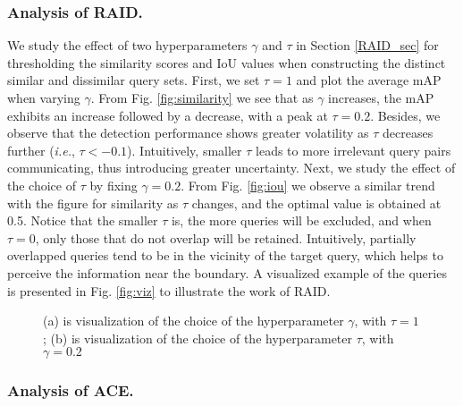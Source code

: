\documentclass[runningheads]{llncs}
\def\ie{{\em i.e.}}
\newcommand{\figref}[1]{Fig. \ref{#1}}
\newcommand{\secref}[1]{Section \ref{#1}}
\begin{document}
\subsubsection{Analysis of RAID.} We study the effect of two hyperparameters $\gamma$ and $\tau$ in \secref{RAID_sec} for thresholding the similarity scores and IoU values when constructing the distinct similar and dissimilar query sets. First, we set $\tau = 1$ and plot the average mAP when varying $\gamma$. From \figref{fig:similarity} we see that as $\gamma$ increases, the mAP exhibits an increase followed by a decrease, with a peak at $\tau=0.2$. Besides, we observe that the detection performance shows greater volatility as $\tau$ decreases further (\ie, $\tau<-0.1$). Intuitively, smaller $\tau$ leads to more irrelevant query pairs communicating, thus introducing greater uncertainty. Next, we study the effect of the choice of $\tau$ by fixing $\gamma = 0.2$. From \figref{fig:iou} we observe a similar trend with the figure for similarity as $\tau$ changes, and the optimal value is obtained at 0.5. Notice that the smaller $\tau$ is, the more queries will be excluded, and when $\tau=0$, only those that do not overlap will be retained. Intuitively, partially overlapped queries tend to be in the vicinity of the target query, which helps to perceive the information near the boundary. A visualized example of the queries is presented in \figref{fig:viz} to illustrate the work of RAID.

\begin{figure}[t]
    \centering
    \setlength{\abovecaptionskip}{-0.005cm}
    \quad
   
  \caption{(a) is visualization of the choice of the hyperparameter $\gamma$, with $\tau = 1$; (b) is visualization of the choice of the hyperparameter $\tau$, with $\gamma = 0.2$ }
  \vspace{-0.3cm}
\end{figure}





\subsubsection{Analysis of ACE.}
\end{document}
